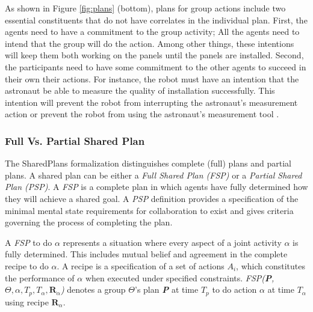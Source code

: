 \documentclass[12pt]{report}
\begin{document}
As shown in Figure \ref{fig:plans} (bottom), plans for group actions include two
essential constituents that do not have correlates in the individual plan.
First, the agents need to have a commitment to the group activity; All the
agents need to intend that the group will do the action. {\color{red}{For
instance, when a robot and an astronaut are collaborating to install a solar
panel, they need to have intentions to install the solar panel together.}} Among
other things, these intentions will keep them both working on the panels until
the panels are installed. Second, the participants need to have some commitment
to the other agents to succeed in their own their actions. For instance, the
robot must have an intention that the astronaut be able to measure the quality
of installation successfully. This intention will prevent the robot from
interrupting the astronaut's measurement action or prevent the robot from using
the astronaut's measurement tool \cite{grosz:collaborative-systems,
grosz:plans-discourse}.

\subsubsection{Full Vs. Partial Shared Plan}
\label{sec:full-partial-plan}

The SharedPlans formalization distinguishes complete (full) plans and partial
plans. A shared plan can be either a \textit{Full Shared Plan (FSP)} or a
\textit{Partial Shared Plan (PSP)}. A \textit{FSP} is a complete plan in which
agents have fully determined how they will achieve a shared goal. A \textit{PSP}
definition provides a specification of the minimal mental state requirements for
collaboration to exist and gives criteria governing the process of completing
the plan.

A \textit{FSP} to do $\alpha$ represents a situation where every aspect of a
joint activity $\alpha$ is fully determined. This includes mutual belief and
agreement in the complete recipe to do $\alpha$. A recipe is a specification of
a set of actions \textit{$A_i$}, which constitutes the performance of $\alpha$
when executed under specified constraints. \textit{FSP(\textbf{P}, $\Theta,
\alpha, T_p, T_\alpha, \textbf{R}_\alpha$)} denotes a group $\Theta$'s plan
\textit{\textbf{P}} at time \textit{$T_p$} to do action $\alpha$ at time
\textit{$T_\alpha$} using recipe \textit{$\textbf{R}_\alpha$}. 
\end{document}
